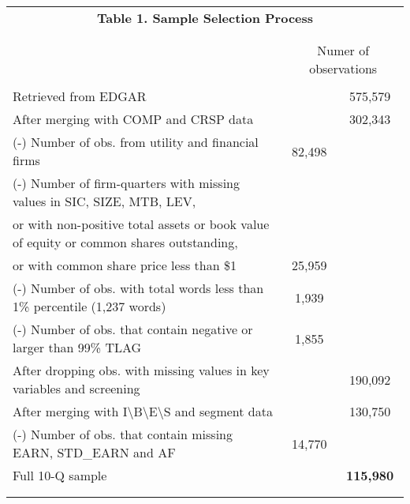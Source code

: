 \begin{table}[htbp] \label{T1}
  \centering
    \begin{tabular}{lcc}
    \multicolumn{3}{c}{\textbf{Table 1. Sample Selection Process}} \\ 
      & &  \\
    \begin{comment}
    \multicolumn{3}{c}{10-Q} \\
    &   \multicolumn{2}{c}{Numer of observations}\\
    & &  \\
    Retrieved from EDGAR & & 575,579 \\
    After merging with COMP and CRSP data & & 302,343 \\
    (-) Number of obs. from utility and financial firms & 82,498 & \\
    (-) Number of firm-quarters with missing values in SIC, SIZE, MTB, LEV, & & \\
    \hspace{5mm}or with non-positive total assets or book value of equity or common shares outstanding, & & \\
    \hspace{5mm}or with common share price less than \$1 & 25,959 & \\
    (-) Number of obs. with total words less than 1\% percentile (1,237 words) & 1,939 & \\
    (-) Number of obs. that contain negative or larger than 99\% TLAG & 1,855 & \\
    \bottomrule
    After dropping obs. with missing values in key variables and screening & & 190,092 \\
    After merging with I\textbackslash{}B\textbackslash{}E\textbackslash{}S and segment data & & 130,750 \\
    (-) Number of obs. that contain missing EARN, STD\_EARN and AF & 14,770 & \\
    \bottomrule
    Full 10-Q sample & & \textbf{115,980} \\
    & &  \\
    \end{comment}
    

\end{tabular}
\end{table}
